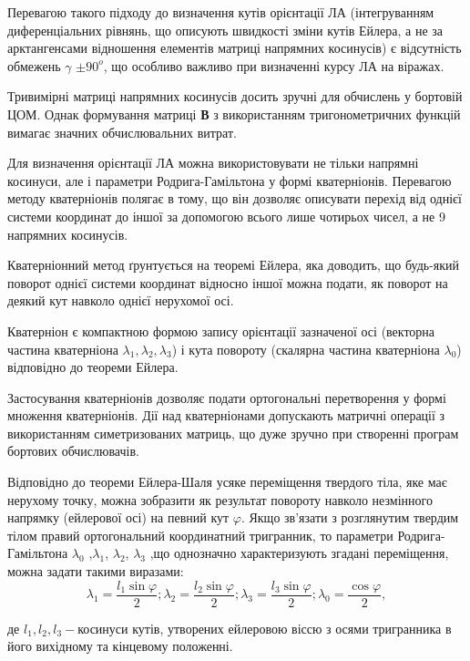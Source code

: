 Перевагою такого підходу до визначення кутів орієнтації ЛА (інтегруванням диференціальних 
рівнянь, що описують швидкості зміни кутів Ейлера, а не за арктангенсами відношення 
елементів матриці напрямних  косинусів) є відсутність обмежень $\gamma$ $\pm90^{o}$, 
що особливо важливо при визначенні курсу ЛА на віражах. 

Тривимірні матриці напрямних  косинусів досить зручні для обчислень у бортовій ЦОМ. 
Однак формування матриці \textbf{В} з використанням тригонометричних функцій вимагає 
значних обчислювальних витрат. 

Для визначення орієнтації ЛА можна використовувати не тільки напрямні косинуси, але 
і параметри Родрига-Гамільтона у формі кватерніонів. Перевагою методу кватерніонів 
полягає в тому, що він дозволяє описувати перехід від однієї системи координат до 
іншої за допомогою всього лише чотирьох чисел, а не 9 напрямних  косинусів.

Кватерніонний метод ґрунтується  на теоремі Ейлера, яка доводить, що будь-який поворот 
однієї системи координат відносно іншої можна подати, як поворот на деякий кут навколо 
однієї нерухомої осі.

Кватерніон є компактною формою запису орієнтації зазначеної осі (векторна частина 
кватерніона $\lambda_{1} ,\lambda_{2} ,\lambda_{3} $) і кута повороту (скалярна 
частина кватерніона $\lambda_{0} $) відповідно до теореми Ейлера.

Застосування кватерніонів дозволяє подати ортогональні перетворення у формі множення 
кватерніонів. Дії над кватерніонами допускають матричні операції з використанням 
симетризованих матриць, що дуже зручно при створенні програм бортових обчислювачів. 

Відповідно 
до теореми Ейлера-Шаля усяке переміщення твердого тіла, яке має нерухому точку, можна 
зобразити як результат повороту навколо незмінного напрямку (ейлерової осі) на певний 
кут $\varphi $. Якщо зв'язати з розглянутим твердим тілом правий ортогональний координатний 
тригранник, то параметри Родрига-Гамільтона $\lambda_{0}$ ,$\lambda_{1}$, $\lambda_{2}$,
$\lambda_{3}$ ,що однозначно характеризують згадані переміщення, можна задати 
такими виразами: 
\[\lambda_{1} =\frac{l_{1} \sin \varphi }{2};
  \lambda_{2} =\frac{l_{2} \sin \varphi }{2};
  \lambda_{3} =\frac{l_{3} \sin \varphi }{2};
  \lambda_{0} =\frac{\cos \varphi }{2} ,\] 
\begin{ESKDexplanation}
 \item де $l_{1} ,l_{2} ,l_{3} -$косинуси кутів, утворених ейлеровою віссю з осями тригранника 
в його вихідному та кінцевому положенні. 
\end{ESKDexplanation}

